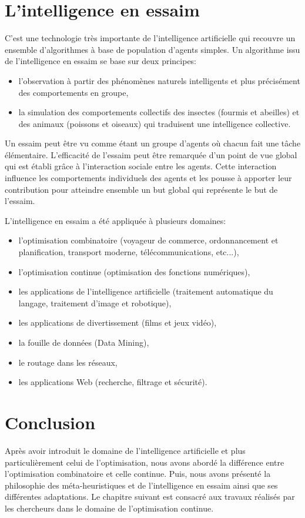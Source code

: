 \section{L'intelligence en essaim}

C'est une technologie très importante de l'intelligence artificielle qui recouvre un ensemble d'algorithmes à base de population d'agents simples. Un algorithme issu de l'intelligence en essaim se base sur deux principes:

\begin{itemize}
	\item l'observation à partir des phénomènes naturels intelligents et plus précisément des comportements en groupe,
	\item la simulation des comportements collectifs des insectes (fourmis
	et abeilles) et des animaux (poissons et oiseaux) qui traduisent une intelligence collective.
\end{itemize}

Un essaim peut être vu comme étant un groupe d'agents où chacun
fait une tâche élémentaire. L'efficacité de l'essaim peut être remarquée
d'un point de vue global qui est établi grâce à l'interaction sociale entre les
agents. Cette interaction influence les comportements individuels
des agents et les pousse à apporter leur contribution pour atteindre ensemble un but global qui représente le but de l'essaim.

L'intelligence en essaim a été appliquée à plusieurs domaines:

\begin{itemize}
	\item l'optimisation combinatoire (voyageur de commerce,
	ordonnancement et planification, transport moderne,
	télécommunications, etc...),
	\item l'optimisation continue (optimisation des fonctions numériques),
	\item les applications de l'intelligence artificielle (traitement automatique
	du langage, traitement d'image et robotique),
	\item les applications de divertissement (films et jeux vidéo),
	\item la fouille de données (Data Mining),
	\item le routage dans les réseaux,
	\item les applications Web (recherche, filtrage et sécurité).
\end{itemize}

\section*{Conclusion}

Après avoir introduit le domaine de l'intelligence artificielle et plus particulièrement celui de l'optimisation, nous avons abordé la différence entre l'optimisation combinatoire et celle continue. Puis, nous avons présenté la philosophie des méta-heuristiques et de l'intelligence en essaim ainsi que ses différentes adaptations. Le chapitre suivant est consacré aux travaux réalisés par les chercheurs dans le domaine de l'optimisation continue.
